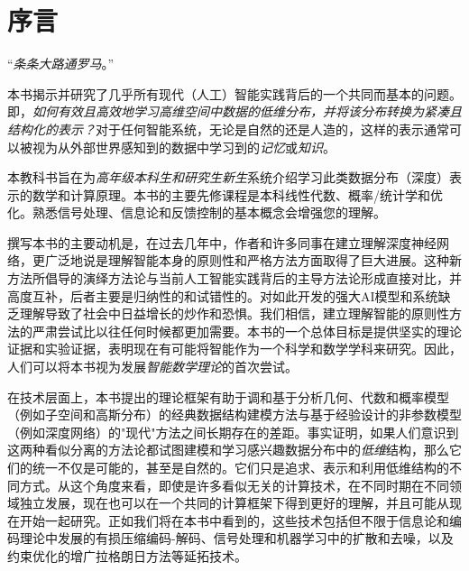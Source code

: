 \documentclass[../../book-main_zh.tex]{subfiles}
\begin{document}
\chapter*{序言}

\begin{center}
``{\em 条条大路通罗马}。''

\end{center}
\vspace{5mm}

本书揭示并研究了几乎所有现代（人工）智能实践背后的一个共同而基本的问题。即，{\em 如何有效且高效地学习高维空间中数据的低维分布，并将该分布转换为紧凑且结构化的表示？}对于任何智能系统，无论是自然的还是人造的，这样的表示通常可以被视为从外部世界感知到的数据中学习到的{\em 记忆}或{\em 知识}。

本教科书旨在为{\em 高年级本科生和研究生新生}系统介绍学习此类数据分布（深度）表示的数学和计算原理。本书的主要先修课程是本科线性代数、概率/统计学和优化。熟悉信号处理、信息论和反馈控制的基本概念会增强您的理解。

撰写本书的主要动机是，在过去几年中，作者和许多同事在建立理解深度神经网络，更广泛地说是理解智能本身的原则性和严格方法方面取得了巨大进展。这种新方法所倡导的演绎方法论与当前人工智能实践背后的主导方法论形成直接对比，并高度互补，后者主要是归纳性的和试错性的。对如此开发的强大AI模型和系统缺乏理解导致了社会中日益增长的炒作和恐惧。我们相信，建立理解智能的原则性方法的严肃尝试比以往任何时候都更加需要。本书的一个总体目标是提供坚实的理论证据和实验证据，表明现在有可能将智能作为一个科学和数学学科来研究。因此，人们可以将本书视为发展{\em 智能数学理论}的首次尝试。

在技术层面上，本书提出的理论框架有助于调和基于分析几何、代数和概率模型（例如子空间和高斯分布）的经典数据结构建模方法与基于经验设计的非参数模型（例如深度网络）的"现代"方法之间长期存在的差距。事实证明，如果人们意识到这两种看似分离的方法论都试图建模和学习感兴趣数据分布中的{\em 低维}结构，那么它们的统一不仅是可能的，甚至是自然的。它们只是追求、表示和利用低维结构的不同方式。从这个角度来看，即使是许多看似无关的计算技术，在不同时期在不同领域独立发展，现在也可以在一个共同的计算框架下得到更好的理解，并且可能从现在开始一起研究。正如我们将在本书中看到的，这些技术包括但不限于信息论和编码理论中发展的有损压缩编码-解码、信号处理和机器学习中的扩散和去噪，以及约束优化的增广拉格朗日方法等延拓技术。
\end{document}
